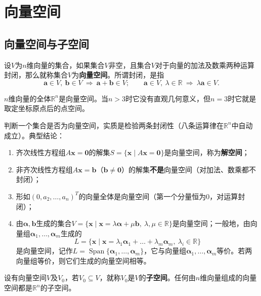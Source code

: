 \section{向量空间}

\subsection{向量空间与子空间}
\begin{definition}[向量空间]
设$V$为$n$维向量的集合，如果集合$V$非空，且集合$V$对于向量的加法及数乘两种运算封闭，那么就称集合$V$为\textbf{向量空间}。所谓封闭，是指
\[
\boldsymbol{a}\in V,\ \boldsymbol{b}\in V\ \Rightarrow\ \boldsymbol{a}+\boldsymbol{b}\in V;
\qquad
\boldsymbol{a}\in V,\ \lambda\in\mathbb{R}\ \Rightarrow\ \lambda\boldsymbol{a}\in V.
\]
\end{definition}

$n$维向量的全体$\mathbb{R}^{n}$是向量空间。当$n>3$时它没有直观几何意义，但$n=3$时它就是取定坐标原点后的点空间。

判断一个集合是否为向量空间，实质是检验两条封闭性（八条运算律在$\mathbb{R}^{n}$中自动成立）。典型结论：
\begin{enumerate}
    \item 齐次线性方程组$A\boldsymbol{x}=\boldsymbol{0}$的解集$S=\{\boldsymbol{x}\mid A\boldsymbol{x}=\boldsymbol{0}\}$是向量空间，称为\textbf{解空间}；
    \item 非齐次线性方程组$A\boldsymbol{x}=\boldsymbol{b}$（$\boldsymbol{b}\ne\boldsymbol{0}$）的解集\textbf{不是}向量空间（对加法、数乘都不封闭）；
    \item 形如$(0,a_2,\dots,a_n)^{T}$的向量全体是向量空间（第一个分量恒为0，对运算封闭）；
    \item 由$\boldsymbol{\alpha},\boldsymbol{b}$生成的集合$V=\{\boldsymbol{x}\mid \boldsymbol{x}=\lambda\boldsymbol{\alpha}+\mu\boldsymbol{b},\ \lambda,\mu\in\mathbb{R}\}$是向量空间；一般地，由向量组$\boldsymbol{\alpha}_1,\dots,\boldsymbol{\alpha}_m$生成的
    \[
    L=\{\boldsymbol{x}\mid \boldsymbol{x}=\lambda_1\boldsymbol{\alpha}_1+\dots+\lambda_m\boldsymbol{\alpha}_m,\ \lambda_i\in\mathbb{R}\}
    \]
    是向量空间，记作$L=\operatorname{Span}\{\boldsymbol{\alpha}_1,\dots,\boldsymbol{\alpha}_m\}$，它与向量组$\boldsymbol{\alpha}_1,\dots,\boldsymbol{\alpha}_m$等价。若两向量组等价，则它们生成的向量空间相等。
\end{enumerate}

\begin{definition}[子空间]
设有向量空间$V$及$V_0$，若$V_0\subseteq V$，就称$V_0$是$V$的\textbf{子空间}。任何由$n$维向量组成的向量空间都是$\mathbb{R}^{n}$的子空间。
\end{definition}

